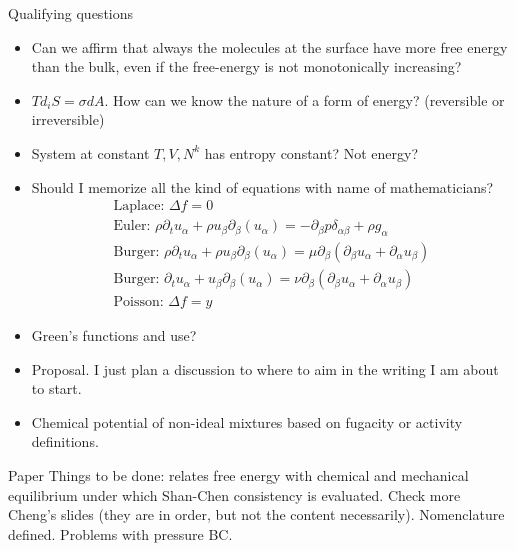 \documentclass[8pt]{beamer}
\newcommand{\kronecker}{\delta_{\alpha \beta}}
\begin{document}
	\begin{frame}[t]{Qualifying questions}
		\begin{itemize}
			\item Can we affirm that always the molecules at the surface have more free energy than the bulk, even if the free-energy is not monotonically increasing?
			\item $Td_i S = \sigma dA$. How can we know the nature of a form of energy? (reversible or irreversible)
			\item System at constant $T, V, N^k$ has entropy constant? Not energy?
			\item Should I memorize all the kind of equations with name of mathematicians? 
			\begin{equation*}
				\begin{split}
					\text{Laplace: } \Delta f = 0\\
					\text{Euler: } 	\rho \partial_t u_\alpha  + \rho u_\beta \partial_\beta (u_\alpha) = - \partial_\beta p\kronecker + \rho g_\alpha\\
					\text{Burger: } \rho \partial_t u_\alpha  + \rho u_\beta \partial_\beta (u_\alpha) = \mu \partial_\beta (\partial_\beta u_\alpha + \partial_\alpha u_\beta)\\
					\text{Burger: } \partial_t u_\alpha  + u_\beta \partial_\beta (u_\alpha) = \nu \partial_\beta (\partial_\beta u_\alpha + \partial_\alpha u_\beta)\\
					\text{Poisson: } \Delta f = y
				\end{split}
			\end{equation*}
		\item Green's functions and use?
		\item Proposal. I just plan a discussion to where to aim in the writing I am about to start.
		\item Chemical potential of non-ideal mixtures based on fugacity or activity definitions. 
		\end{itemize}
	\end{frame}
		
	\begin{frame}[t]{Paper}
		Things to be done: relates free energy with chemical and mechanical equilibrium under which Shan-Chen consistency is evaluated. Check more Cheng's slides (they are in order, but not the content necessarily). Nomenclature defined. Problems with pressure BC.
	\end{frame}
\end{document}
